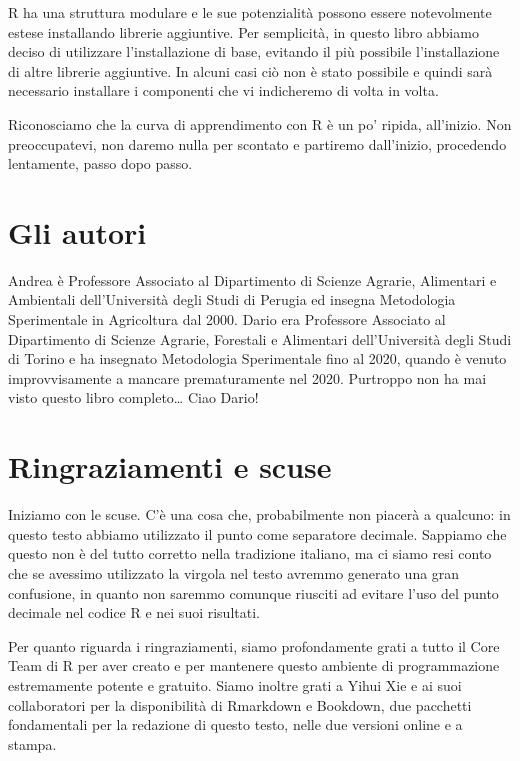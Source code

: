 \documentclass[a4paper,12pt,oneside]{book}
\begin{document}
R ha una struttura modulare e le sue potenzialità possono essere notevolmente estese installando librerie aggiuntive. Per semplicità, in questo libro abbiamo deciso di utilizzare l'installazione di base, evitando il più possibile l'installazione di altre librerie aggiuntive. In alcuni casi ciò non è stato possibile e quindi sarà necessario installare i componenti che vi indicheremo di volta in volta.

Riconosciamo che la curva di apprendimento con R è un po' ripida, all'inizio. Non preoccupatevi, non daremo nulla per scontato e partiremo dall'inizio, procedendo lentamente, passo dopo passo.

\hypertarget{gli-autori}{%
\section*{Gli autori}\label{gli-autori}}

Andrea è Professore Associato al Dipartimento di Scienze Agrarie, Alimentari e Ambientali dell'Università degli Studi di Perugia ed insegna Metodologia Sperimentale in Agricoltura dal 2000. Dario era Professore Associato al Dipartimento di Scienze Agrarie, Forestali e Alimentari dell'Università degli Studi di Torino e ha insegnato Metodologia Sperimentale fino al 2020, quando è venuto improvvisamente a mancare prematuramente nel 2020. Purtroppo non ha mai visto questo libro completo\ldots{} Ciao Dario!

\hypertarget{ringraziamenti-e-scuse}{%
\section*{Ringraziamenti e scuse}\label{ringraziamenti-e-scuse}}

Iniziamo con le scuse. C'è una cosa che, probabilmente non piacerà a qualcuno: in questo testo abbiamo utilizzato il punto come separatore decimale. Sappiamo che questo non è del tutto corretto nella tradizione italiano, ma ci siamo resi conto che se avessimo utilizzato la virgola nel testo avremmo generato una gran confusione, in quanto non saremmo comunque riusciti ad evitare l'uso del punto decimale nel codice R e nei suoi risultati.

Per quanto riguarda i ringraziamenti, siamo profondamente grati a tutto il Core Team di R per aver creato e per mantenere questo ambiente di programmazione estremamente potente e gratuito. Siamo inoltre grati a Yihui Xie e ai suoi collaboratori per la disponibilità di Rmarkdown e Bookdown, due pacchetti fondamentali per la redazione di questo testo, nelle due versioni online e a stampa.
\end{document}
